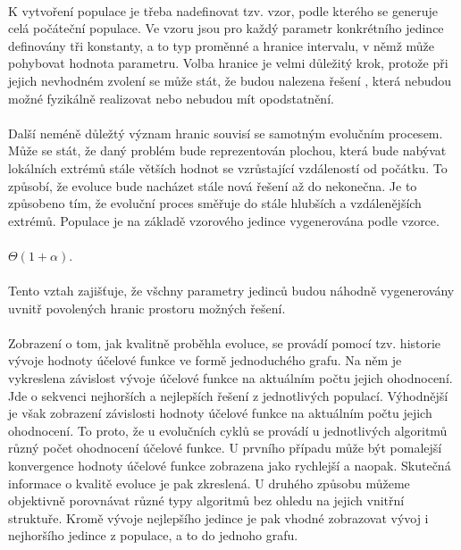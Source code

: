 \documentclass[bc,male,java,dept460]{diploma}		%
\begin{document}
\paragraph*{}
K vytvoření populace je třeba nadefinovat tzv. vzor, podle kterého se generuje celá počáteční populace. Ve vzoru jsou pro každý parametr konkrétního jedince definovány tři konstanty, a to typ proměnné a hranice intervalu, v němž může pohybovat hodnota parametru. Volba hranice je velmi důležitý krok, protože při jejich nevhodném zvolení se může stát, že budou nalezena řešení , která nebudou možné fyzikálně realizovat nebo nebudou mít opodstatnění. 

\paragraph*{}
Další neméně důležtý význam hranic souvisí se samotným evolučním procesem. Může se stát, že daný problém bude reprezentován plochou, která bude nabývat lokálních extrémů stále větších hodnot se vzrůstající vzdáleností od počátku. To způsobí, že evoluce bude nacházet stále nová řešení až do nekonečna. Je to způsobeno tím, že evoluční proces směřuje do stále hlubších a vzdálenějších extrémů.
Populace je na základě vzorového jedince vygenerována podle vzorce.

\paragraph*{}
$\Theta(1+\alpha)$.  

\paragraph*{}
Tento vztah zajišťuje, že všchny parametry jedinců budou náhodně vygenerovány uvnitř povolených hranic prostoru možných řešení.

\paragraph*{}
Zobrazení o tom, jak kvalitně proběhla evoluce, se provádí pomocí tzv. historie vývoje hodnoty účelové funkce ve formě jednoduchého grafu. Na něm je vykreslena závislost vývoje účelové funkce na aktuálním počtu jejich ohodnocení. Jde o sekvenci nejhorších a nejlepších řešení z jednotlivých populací. Výhodnější je však zobrazení závislosti hodnoty účelové funkce na aktuálním počtu jejich ohodnocení. To proto, že u evolučních cyklů se provádí u jednotlivých algoritmů různý počet ohodnocení účelové funkce. U prvního případu může být pomalejší konvergence hodnoty účelové funkce zobrazena jako rychlejší a naopak. Skutečná informace o kvalitě evoluce je pak zkreslená. U druhého způsobu můžeme objektivně porovnávat různé typy algoritmů bez ohledu na jejich vnitřní struktuře.
Kromě vývoje nejlepšího jedince je pak vhodné zobrazovat vývoj i nejhoršího jedince z populace, a to do jednoho grafu.
\end{document}
